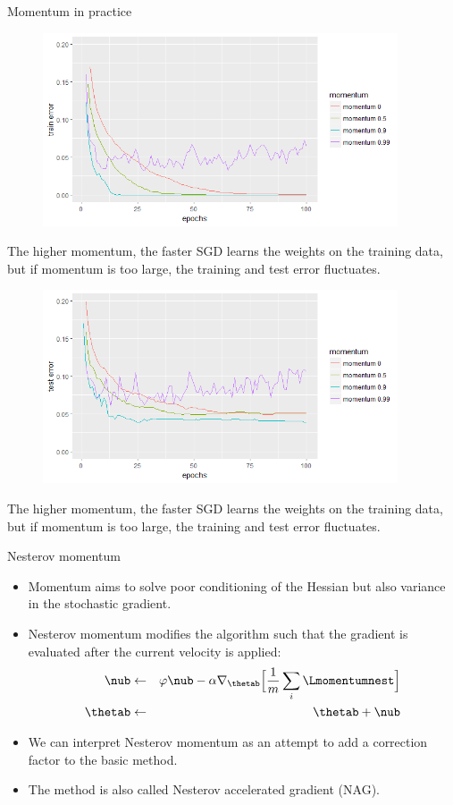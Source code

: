 \begin{vbframe}{Momentum in practice}
  \begin{figure}
  \begin{center}
    \includegraphics[width=10.5cm]{plots/momentum_train.png}
    \end{center}
  \end{figure}
    \small{The higher momentum, the faster SGD learns the weights on the training data, but if momentum is too large, the training and test error fluctuates.}

\framebreak

  \begin{figure}
  \centering
    \includegraphics[width=10.5cm]{plots/momentum_test.png}
  \end{figure}
      \small{The higher momentum, the faster SGD learns the weights on the training data, but if momentum is too large, the training and test error fluctuates.}
\end{vbframe}


\begin{vbframe}{Nesterov momentum}
  \begin{itemize}
    \item Momentum aims to solve poor conditioning of the Hessian but also variance in the stochastic gradient.
    \item Nesterov momentum modifies the algorithm such that the gradient is evaluated after the current velocity is applied:
      \begin{eqnarray*} 
        \nub &\leftarrow& \varphi \nub - \alpha \nabla_{\thetab} \Big[\frac{1}{m} \sum_{i} \Lmomentumnest \Big] \\
        \thetab &\leftarrow& \thetab + \nub
      \end{eqnarray*}
    \item We can interpret Nesterov momentum as an attempt to add a correction factor to the basic method.
    \item The method is also called Nesterov accelerated gradient (NAG).
  \end{itemize}
\end{vbframe}


